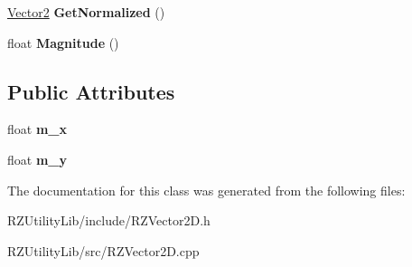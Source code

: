 \begin{DoxyCompactItemize}
\item 
\hypertarget{classrcz_engine_1_1_vector2_a8aa24b7688be64642be7a383f48017f2}{}\hyperlink{classrcz_engine_1_1_vector2}{Vector2} {\bfseries Get\+Normalized} ()\label{classrcz_engine_1_1_vector2_a8aa24b7688be64642be7a383f48017f2}

\item 
\hypertarget{classrcz_engine_1_1_vector2_aa81c90456d8c29fae417d8a7b5695fbc}{}float {\bfseries Magnitude} ()\label{classrcz_engine_1_1_vector2_aa81c90456d8c29fae417d8a7b5695fbc}

\end{DoxyCompactItemize}
\subsection*{Public Attributes}
\begin{DoxyCompactItemize}
\item 
\hypertarget{classrcz_engine_1_1_vector2_a80c3176556eb11676b045054fe094942}{}float {\bfseries m\+\_\+x}\label{classrcz_engine_1_1_vector2_a80c3176556eb11676b045054fe094942}

\item 
\hypertarget{classrcz_engine_1_1_vector2_ab5d6890f95a8227b8695ca4147e7bc04}{}float {\bfseries m\+\_\+y}\label{classrcz_engine_1_1_vector2_ab5d6890f95a8227b8695ca4147e7bc04}

\end{DoxyCompactItemize}


The documentation for this class was generated from the following files\+:\begin{DoxyCompactItemize}
\item 
R\+Z\+Utility\+Lib/include/R\+Z\+Vector2\+D.\+h\item 
R\+Z\+Utility\+Lib/src/R\+Z\+Vector2\+D.\+cpp\end{DoxyCompactItemize}

